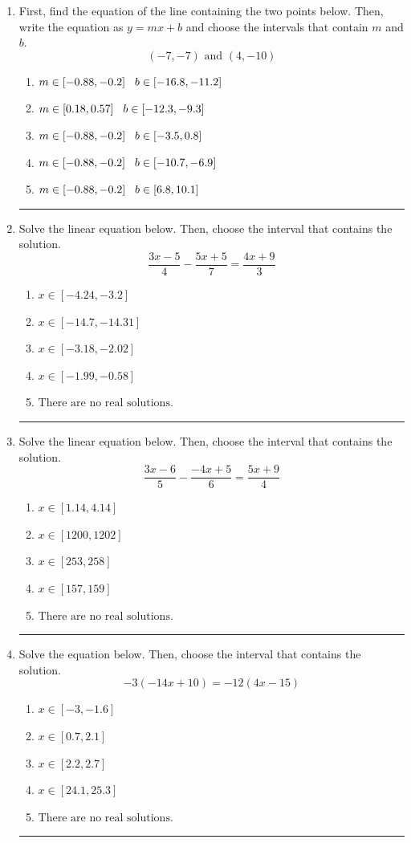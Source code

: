 \documentclass[14pt]{extbook}
\newcommand{\litem}[1]{\item#1\hspace*{-1cm}\rule{\textwidth}{0.4pt}}
\begin{document}
\begin{enumerate}
{\begin{enumerate}[label=\Alph*.]
\end{enumerate} }
\litem{
First, find the equation of the line containing the two points below. Then, write the equation as $ y=mx+b $ and choose the intervals that contain $m$ and $b$.\[ (-7, -7) \text{ and } (4, -10) \]\begin{enumerate}[label=\Alph*.]
\item \( m \in [-0.88, -0.2] \hspace*{3mm} b \in [-16.8, -11.2] \)
\item \( m \in [0.18, 0.57] \hspace*{3mm} b \in [-12.3, -9.3] \)
\item \( m \in [-0.88, -0.2] \hspace*{3mm} b \in [-3.5, 0.8] \)
\item \( m \in [-0.88, -0.2] \hspace*{3mm} b \in [-10.7, -6.9] \)
\item \( m \in [-0.88, -0.2] \hspace*{3mm} b \in [6.8, 10.1] \)

\end{enumerate} }
\litem{
Solve the linear equation below. Then, choose the interval that contains the solution.\[ \frac{3x -5}{4} - \frac{5x + 5}{7} = \frac{4x + 9}{3} \]\begin{enumerate}[label=\Alph*.]
\item \( x \in [-4.24, -3.2] \)
\item \( x \in [-14.7, -14.31] \)
\item \( x \in [-3.18, -2.02] \)
\item \( x \in [-1.99, -0.58] \)
\item \( \text{There are no real solutions.} \)

\end{enumerate} }
\litem{
Solve the linear equation below. Then, choose the interval that contains the solution.\[ \frac{3x -6}{5} - \frac{-4x + 5}{6} = \frac{5x + 9}{4} \]\begin{enumerate}[label=\Alph*.]
\item \( x \in [1.14, 4.14] \)
\item \( x \in [1200, 1202] \)
\item \( x \in [253, 258] \)
\item \( x \in [157, 159] \)
\item \( \text{There are no real solutions.} \)

\end{enumerate} }
\litem{
Solve the equation below. Then, choose the interval that contains the solution.\[ -3(-14x + 10) = -12(4x -15) \]\begin{enumerate}[label=\Alph*.]
\item \( x \in [-3, -1.6] \)
\item \( x \in [0.7, 2.1] \)
\item \( x \in [2.2, 2.7] \)
\item \( x \in [24.1, 25.3] \)
\item \( \text{There are no real solutions.} \)

\end{enumerate} }
\end{enumerate}
\end{document}
